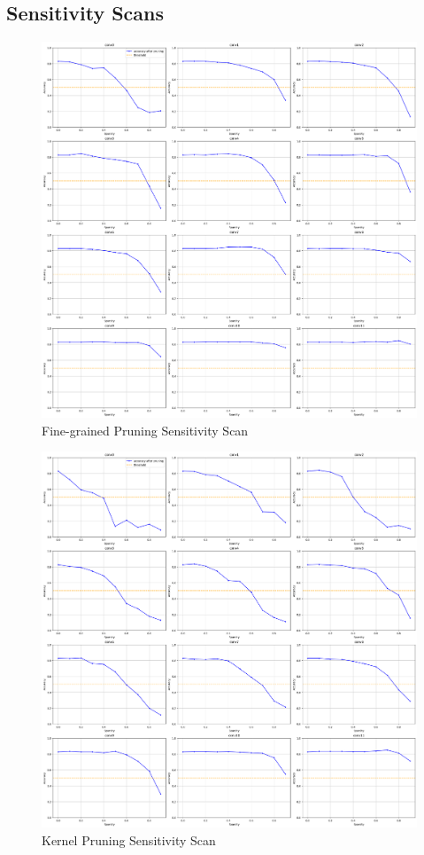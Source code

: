 \documentclass[12pt]{article}
\begin{document}
\subsection{Sensitivity Scans}
\label{graphs_section}
\begin{figure}[h]
  \centering
  \includegraphics[width=1\linewidth]{report_images/sense_fine.png}
  \caption{\label{fig:sense_fine}Fine-grained Pruning Sensitivity Scan}
\end{figure}
\FloatBarrier

\begin{figure}[h]
  \centering
  \includegraphics[width=1\linewidth]{report_images/sense_kernel.png}
  \caption{\label{fig:sense_kernel}Kernel Pruning Sensitivity Scan}
\end{figure}
\FloatBarrier
\end{document}
